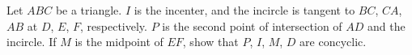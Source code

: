 Let $ABC$ be a triangle. $I$ is the incenter, and the incircle is tangent to $BC$,  $CA$,  $AB$ at $D$,  $E$,  $F$,  respectively. $P$ is the second point of intersection of $AD$ and the incircle. If $M$ is the midpoint of $EF$,  show that $P$,  $I$,  $M$,  $D$ are concyclic.